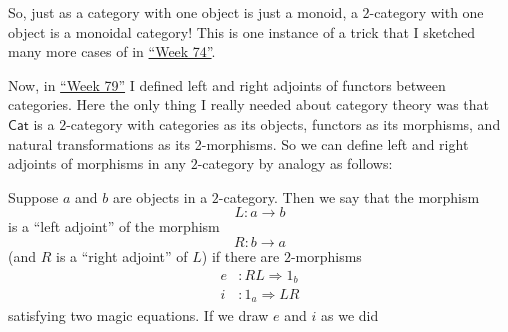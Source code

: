 \documentclass{article}
\begin{document}
So, just as a category with one object is just a monoid, a
\(2\)-category with one object is a monoidal category! This is one
instance of a trick that I sketched many more cases of in
\protect\hyperlink{week74}{``Week 74''}.

Now, in \protect\hyperlink{week79}{``Week 79''} I defined left and right
adjoints of functors between categories. Here the only thing I really
needed about category theory was that \(\mathsf{Cat}\) is a
\(2\)-category with categories as its objects, functors as its
morphisms, and natural transformations as its 2-morphisms. So we can
define left and right adjoints of morphisms in any \(2\)-category by
analogy as follows:

Suppose \(a\) and \(b\) are objects in a \(2\)-category. Then we say
that the morphism \[L\colon a\to b\] is a ``left adjoint'' of the
morphism \[R\colon b\to a\] (and \(R\) is a ``right adjoint'' of \(L\))
if there are \(2\)-morphisms \[
  \begin{aligned}
    e&\colon RL\Rightarrow 1_b
  \\i&\colon 1_a\Rightarrow LR
  \end{aligned}
\] satisfying two magic equations. If we draw \(e\) and \(i\) as we did
\end{document}
